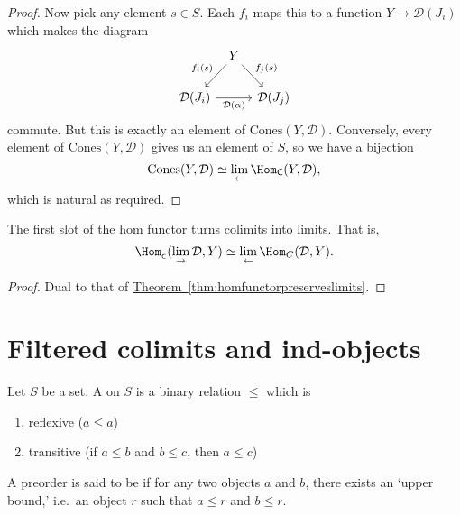 \documentclass[notes.tex]{subfiles}
\begin{document}
\begin{proof}
  Now pick any element $s \in S$. Each $f_{i}$ maps this to a function $Y \to \mathcal{D}(J_{i})$ which makes the diagram
  \begin{equation*}
    \begin{tikzcd}[column sep=tiny]
      & Y
      \arrow[dl, swap, "f_{i}(s)"]
      \arrow[dr, "f_{j}(s)"]
      \\
      \mathcal{D}(J_{i})
      \arrow[rr, swap, "\mathcal{D}(\alpha)"]
      & & \mathcal{D}(J_{j})
    \end{tikzcd}
  \end{equation*}
  commute. But this is exactly an element of $\mathrm{Cones}(Y, \mathcal{D})$. Conversely, every element of $\mathrm{Cones}(Y, \mathcal{D})$ gives us an element of $S$, so we have a bijection
  \begin{equation*}
    \mathrm{Cones}(Y, \mathcal{D}) \simeq \lim_{\leftarrow} \Hom_{\mathsf{C}}(Y, \mathcal{D}),
  \end{equation*}
  which is natural as required.
\end{proof}

\begin{corollary}
  The first slot of the hom functor turns colimits into limits. That is,
  \begin{equation*}
    \Hom_{_\mathsf{C}}(\lim_{\rightarrow}\mathcal{D}, Y) \simeq \lim_{\leftarrow}\Hom_{C}(\mathcal{D}, Y).
  \end{equation*}
\end{corollary}
\begin{proof}
  Dual to that of \hyperref[thm:homfunctorpreserveslimits]{Theorem~\ref*{thm:homfunctorpreserveslimits}}.
\end{proof}



\section{Filtered colimits and ind-objects}

\begin{definition}[preorder]
  \label{def:preorder}
  Let $S$ be a set. A  on $S$ is a binary relation $\leq$ which is
  \begin{enumerate}
    \item reflexive ($a \leq a$)

    \item transitive (if $a \leq b$ and $b \leq c$, then $a \leq c$)
  \end{enumerate}

  A preorder is said to be  if for any two objects $a$ and $b$, there exists an `upper bound,' i.e.\ an object $r$ such that $a \leq r$ and $b \leq r$.
\end{definition}
\end{document}
